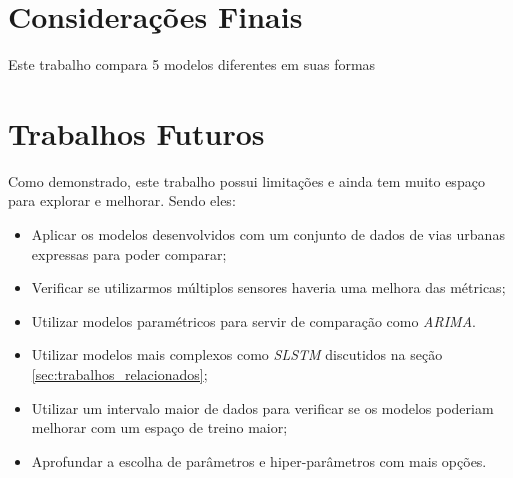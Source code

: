 \section{Considerações Finais}

Este trabalho compara 5 modelos diferentes em suas formas 

\section{Trabalhos Futuros}

Como demonstrado, este trabalho possui limitações e ainda tem muito espaço para explorar e melhorar. Sendo eles:

\begin{itemize}
    \item Aplicar os modelos desenvolvidos com um conjunto de dados de vias urbanas expressas para poder comparar;
    \item Verificar se utilizarmos múltiplos sensores haveria uma melhora das métricas;
    \item Utilizar modelos paramétricos para servir de comparação como \textit{\acrshort{ARIMA}}.
    \item Utilizar modelos mais complexos como \textit{\acrshort{SLSTM}} discutidos na seção \ref{sec:trabalhos_relacionados};
    \item Utilizar um intervalo maior de dados para verificar se os modelos poderiam melhorar com um espaço de treino maior;
    \item Aprofundar a escolha de parâmetros e hiper-parâmetros com mais opções.
\end{itemize}

